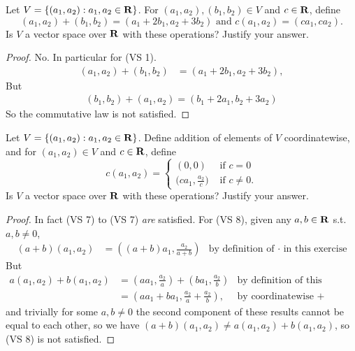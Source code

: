 \begin{exercise} \label{exercise 1.2.18}
Let \(V = \{(a_1, a_2) : a_1, a_2 \in \mathbf{R}\}\).
For \((a_1, a_2), (b_1, b_2) \in V\) and \(c \in \mathbf{R}\), define
\[
    (a_1, a_2) + (b_1, b_2) = (a_1 + 2b_1, a_2 + 3b_2) \text{ and } c(a_1, a_2) = (ca_1, ca_2).
\]
Is \(V\) a vector space over \(\mathbf{R}\) with these operations?
Justify your answer.
\end{exercise}

\begin{proof}
No.
In particular for (VS 1).
\begin{align*}
    (a_1, a_2) + (b_1, b_2) & = (a_1 + 2b_1, a_2 + 3b_2),
\end{align*}
But
\begin{align*}
    (b_1, b_2) + (a_1, a_2) = (b_1 + 2a_1, b_2 + 3a_2)
\end{align*}
So the commutative law is not satisfied.
\end{proof}

\begin{exercise} \label{exercise 1.2.19}
Let \(V = \{(a_1, a_2 ) : a_1, a_2 \in \mathbf{R}\}\).
Define addition of elements of \(V\) coordinatewise, and for \((a_1, a_2) \in V\) and \(c \in \mathbf{R}\), define
\begin{equation*}
    c(a_1, a_2) =
    \begin{cases}
        (0, 0) & \text{ if } c = 0 \\
        \Big(c a_1, \frac{a_2}{c}\Big) & \text{ if } c \ne 0.
    \end{cases}
\end{equation*}
Is \(V\) a vector space over \(\mathbf{R}\) with these operations?
Justify your answer.
\end{exercise}

\begin{proof}
In fact  (VS 7) to (VS 7) \emph{are} satisfied.
For (VS 8), given any \(a, b \in \mathbf{R}\) s.t. \(a, b \ne 0\),
\begin{align*}
    (a + b)(a_1, a_2) & = ((a + b)a_1, \frac{a_2}{a + b}) & \text{by definition of \(\cdot\) in this exercise}
\end{align*}
But
\begin{align*}
    a(a_1, a_2) + b(a_1, a_2) & = (a a_1, \frac{a_2}{a}) + (b a_1, \frac{a_2}{b}) & \text{by definition of this exercise} \\
                              & = (a a_1 + b a_1, \frac{a_2}{a} + \frac{a_2}{b}), & \text{by coordinatewise \(+\)}
\end{align*}
and trivially for some \(a, b \ne 0\) the second component of these results cannot be equal to each other,
so we have \((a + b)(a_1, a_2) \ne a(a_1, a_2) + b(a_1, a_2)\), so (VS 8) is not satisfied.
\end{proof}

